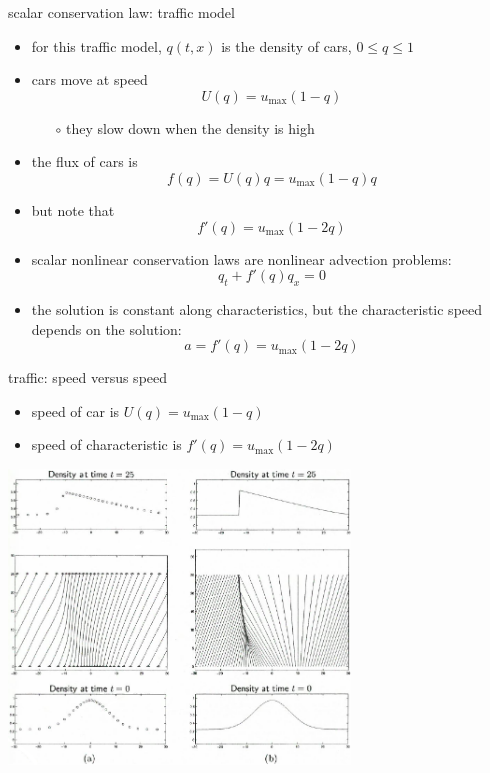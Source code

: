 \documentclass[10pt,dvipsnames,usepdftitle=false,
hyperref={pdftitle = {Finite volume methods},
    pdfauthor = {Ed Bueler}}]{beamer}
\begin{document}
\begin{frame}{scalar conservation law: traffic model}

\begin{itemize}
\item for this traffic model, $q(t,x)$ is the density of cars, $0\le q \le 1$
\item cars move at speed
    $$U(q) = u_{\max} (1-q)$$

    \begin{itemize}
    \item[$\circ$] they slow down when the density is high
    \end{itemize}
\item the flux of cars is
    $$f(q) = U(q) q = u_{\max} (1-q) q$$
\item but note that
    $$f'(q) = u_{\max} (1-2q)$$
\item scalar nonlinear conservation laws are nonlinear advection problems:
    $$q_t + f'(q) q_x = 0$$
\item the solution is constant along characteristics, but the characteristic speed depends on the solution:
    $$a = f'(q) = u_{\max} (1-2q)$$
\end{itemize}
\end{frame}


\begin{frame}{traffic: speed versus speed}

\begin{itemize}
\item speed of car is $U(q) = u_{\max} (1-q)$
\item speed of characteristic is $f'(q) = u_{\max} (1-2q)$
\end{itemize}

\begin{center}
\includegraphics[width=0.68\textwidth]{figs/leveque11p1}
\end{center}
\end{frame}
\end{document}
